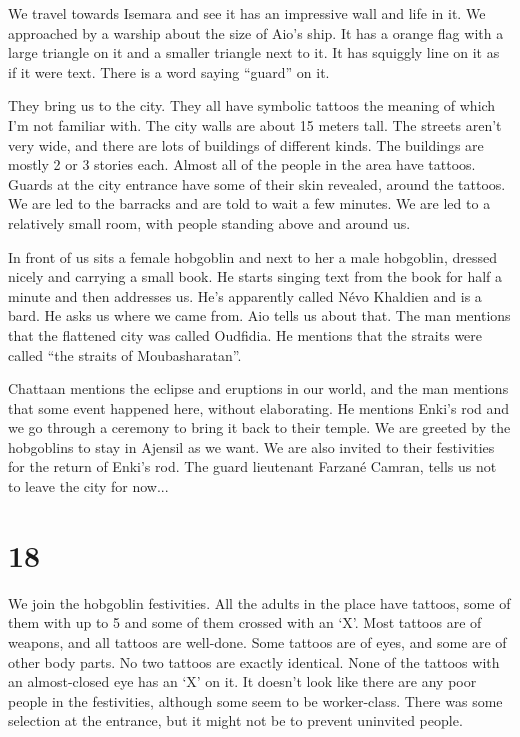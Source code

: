 \documentclass[10pt,a4paper,twoside,openany,hidelinks]{book}
\begin{document}
We travel towards Isemara and see it has an impressive wall and life in it. We approached by a warship about the size of Aio's ship. It has a orange flag with a large triangle on it and a smaller triangle next to it. It has squiggly line on it as if it were text. There is a word saying ``guard'' on it.

They bring us to the city. They all have symbolic tattoos the meaning of which I'm not familiar with. The city walls are about 15 meters tall. The streets aren't very wide, and there are lots of buildings of different kinds. The buildings are mostly 2 or 3 stories each. Almost all of the people in the area have tattoos. Guards at the city entrance have some of their skin revealed, around the tattoos. We are led to the barracks and are told to wait a few minutes. We are led to a relatively small room, with people standing above and around us.

In front of us sits a female hobgoblin and next to her a male hobgoblin, dressed nicely and carrying a small book. He starts singing text from the book for half a minute and then addresses us. He's apparently called Névo Khaldien and is a bard. He asks us where we came from. Aio tells us about that. The man mentions that the flattened city was called Oudfidia. He mentions that the straits were called ``the straits of Moubasharatan''.

Chattaan mentions the eclipse and eruptions in our world, and the man mentions that some event happened here, without elaborating. He mentions Enki's rod and we go through a ceremony to bring it back to their temple. We are greeted by the hobgoblins to stay in Ajensil as we want. We are also invited to their festivities for the return of Enki's rod.
The guard lieutenant Farzané Camran, tells us not to leave the city for now...

\chapter*{18}

We join the hobgoblin festivities. All the adults in the place have tattoos, some of them with up to 5 and some of them crossed with an `X'. Most tattoos are of weapons, and all tattoos are well-done. Some tattoos are of eyes, and some are of other body parts. No two tattoos are exactly identical. None of the tattoos with an almost-closed eye has an `X' on it. It doesn't look like there are any poor people in the festivities, although some seem to be worker-class. There was some selection at the entrance, but it might not be to prevent uninvited people.
\end{document}
